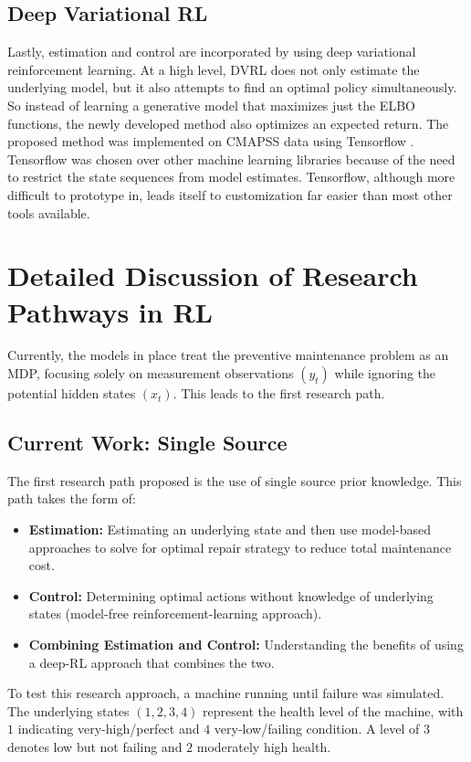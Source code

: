 \documentclass[english]{article}
\numberwithin{equation}{section}
\begin{document}
	\subsection*{Deep Variational RL}
	Lastly, estimation and control are incorporated by using deep variational reinforcement learning. At a high level, DVRL does not only estimate the underlying model, but it also attempts to find an optimal policy simultaneously. So instead of learning a generative model that maximizes just the ELBO functions, the newly developed method also optimizes an expected return. The proposed method was implemented on CMAPSS data using Tensorflow \cite{tensor}.  Tensorflow was chosen over other machine learning libraries because of the need to restrict the state sequences from model estimates. Tensorflow, although more difficult to prototype in, leads itself to customization far easier than most other tools available.
	 
	\section*{Detailed Discussion of Research Pathways in RL}
	Currently, the models in place treat the preventive maintenance problem as an MDP, focusing solely on measurement observations $(y_t)$ while ignoring the potential hidden states $(x_t)$. This leads to the first research path.
	
	\subsection*{Current Work: Single Source}
	The first research path proposed is the use of single source prior knowledge.  This path takes the form of:
	
	\begin{itemize}
		\item \textbf{Estimation:} Estimating an underlying state and then use model-based approaches to solve for optimal repair strategy to reduce total maintenance cost.
		\item \textbf{Control:} Determining optimal actions without knowledge of underlying states (model-free reinforcement-learning approach).
		\item \textbf{Combining Estimation and Control:} Understanding the benefits of using a deep-RL approach that combines the two.
	\end{itemize}
	
	
	To test this research approach, a machine running until failure was simulated. The underlying states $(1,2,3,4)$ represent the health level of the machine, with $1$ indicating very-high/perfect and $4$ very-low/failing condition. A level of $3$ denotes low but not failing and $2$ moderately high health.
	
\end{document}
